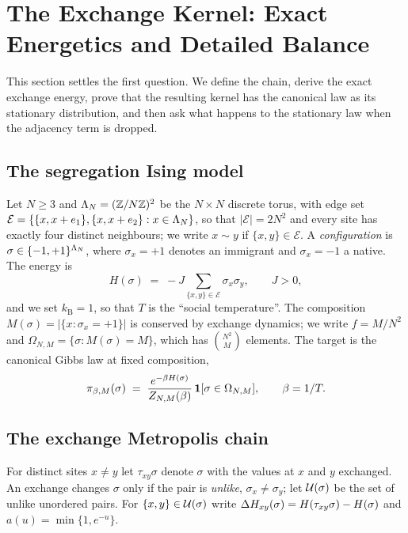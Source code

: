 \section{The Exchange Kernel: Exact Energetics and Detailed Balance}
\label{sec:theory}
This section settles the first question. We define the chain, derive the exact exchange energy, prove that the resulting kernel has the canonical law as its stationary distribution, and then ask what happens to the stationary law when the adjacency term is dropped.

\subsection{The segregation Ising model}
Let $N\ge 3$ and $\Lambda_N=(\mathbb{Z}/N\mathbb{Z})^2$ be the $N\times N$ discrete torus, with edge set $\mathcal E=\{\{x,x+e_1\},\{x,x+e_2\}:x\in\Lambda_N\}$, so that $|\mathcal E|=2N^2$ and every site has exactly four distinct neighbours; we write $x\sim y$ if $\{x,y\}\in\mathcal E$. A \emph{configuration} is $\sigma\in\{-1,+1\}^{\Lambda_N}$, where $\sigma_x=+1$ denotes an immigrant and $\sigma_x=-1$ a native. The energy is
\begin{equation}
H(\sigma)\;=\;-J\sum_{\{x,y\}\in\mathcal E}\sigma_x\sigma_y,\qquad J>0,
\label{eq:H}
\end{equation}
and we set $k_{\mathrm B}=1$, so that $T$ is the ``social temperature''. The composition $M(\sigma)=|\{x:\sigma_x=+1\}|$ is conserved by exchange dynamics; we write $f=M/N^2$ and $\Omega_{N,M}=\{\sigma:M(\sigma)=M\}$, which has $\binom{N^2}{M}$ elements. The target is the canonical Gibbs law at fixed composition,
\begin{equation}
\pi_{\beta,M}(\sigma)\;=\;\frac{e^{-\beta H(\sigma)}}{Z_{N,M}(\beta)}\,\mathbf{1}[\sigma\in\Omega_{N,M}],\qquad \beta=1/T.
\label{eq:gibbs}
\end{equation}

\subsection{The exchange Metropolis chain}
For distinct sites $x\ne y$ let $\tau_{xy}\sigma$ denote $\sigma$ with the values at $x$ and $y$ exchanged. An exchange changes $\sigma$ only if the pair is \emph{unlike}, $\sigma_x\ne\sigma_y$; let $\mathcal{U}(\sigma)$ be the set of unlike unordered pairs. For $\{x,y\}\in\mathcal{U}(\sigma)$ write $\Delta H_{xy}(\sigma)=H(\tau_{xy}\sigma)-H(\sigma)$ and $a(u)=\min\{1,e^{-u}\}$.


